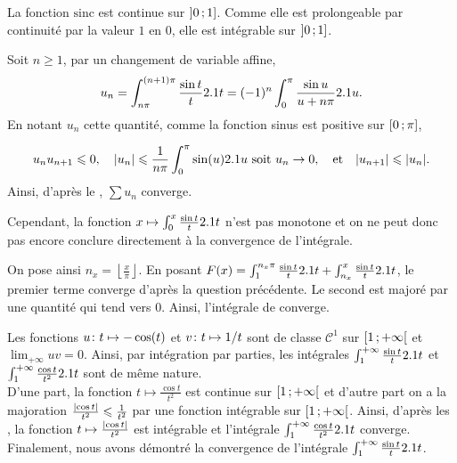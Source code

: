 \begin{solution}
\begin{reponses}
\item La fonction $\mathrm{sinc}$ est continue sur $\interof{0}{1}$. Comme elle est prolongeable par continuité par la valeur $1$ en $0$, elle est intégrable sur $\interof{0}{1}$.

\item Soit $n \geqslant 1$, par un changement de variable affine,
\[
u_n =
\int_{n\pi}^{(n+1)\pi} \frac{\sin t}{t} \d t
= (-1)^n \int_0^\pi \frac{\sin u}{u + n \pi} \d u.
\]
En notant $u_n$ cette quantité, comme la fonction sinus est positive sur $\interff{0}{\pi}$,
\begin{comment}
\item $u_n u_{n+1} \leq 0$,
\item $\abs{u_n} \leq \frac{1}{n\pi} \int_0^\pi \sin(u) \d u$ soit $u_n \to 0$,
\item $\abs{u_{n+1}} \leq \abs{u_n}$.
\end{comment}
\[
u_n u_{n+1} \leqslant 0, \quad \abs{u_n} \leqslant \frac{1}{n\pi} \int_0^\pi \sin(u) \d u \text{ soit } u_n \to 0, \quad \text{et} \quad \abs{u_{n+1}} \leqslant \abs{u_n}.
\]
Ainsi, d'après le , $\sum u_n$ converge.

\medskip

Cependant, la fonction $x \mapsto \int_0^x \frac{\sin t}{t} \d t$ n'est pas monotone et on ne peut donc pas encore conclure directement à la convergence de l'intégrale.

On pose ainsi $n_x = \left\lfloor\frac{x}{\pi}\right\rfloor$. En posant $F(x) = \int_1^{n_x\pi} \frac{\sin t}{t} \d t + \int_{n_x}^x \frac{\sin t}{t} \d t$, le premier terme converge d'après la question précédente. Le second est majoré par une quantité qui tend vers $0$. Ainsi, l'intégrale de  converge.

\item Les fonctions $\fonctionligne[u]{t}{-\cos(t)}$ et $\fonctionligne[v]{t}{1/t}$ sont de classe $\mathscr{C}^1$ sur $\interfo{1}{+\infty}$ et $\lim_{+\infty} u v = 0$. Ainsi, par intégration par parties, les intégrales $\int_1^{+\infty} \frac{\sin t}{t} \d t$ et $\int_1^{+\infty} \frac{\cos t}{t^2} \d t$ sont de même nature. \\
D'une part, la fonction $t \mapsto \frac{\cos t}{t^2}$ est continue sur $\interfo{1}{+\infty}$ et d'autre part on a la majoration $\frac{\abs{\cos t}}{t^2} \leqslant \frac{1}{t^2}$ par une fonction intégrable sur $\interfo{1}{+\infty}$. Ainsi, d'après les , la fonction $t \mapsto \frac{\abs{\cos t}}{t^2}$ est intégrable et l'intégrale $\int_1^{+\infty} \frac{\cos t}{t^2} \d t$ converge. Finalement, nous avons démontré la convergence de l'intégrale $\int_1^{+\infty} \frac{\sin t}{t} \d t$.
\end{reponses}
\end{solution}

